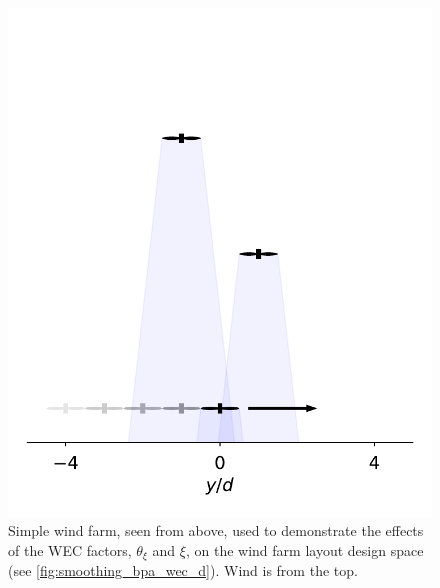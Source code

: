 \documentclass[a4paper]{jpconf}
\begin{document}
\begin{figure}[ht]
	\centering
	\begin{minipage}[t]{0.47\textwidth}
		\centering
		\includegraphics[width=\textwidth, trim={-2.0cm -0.0cm -2.0cm 3.5cm}, clip]{final_images/layouts/3turb-design-space}
		\caption{Simple wind farm, seen from above, used to demonstrate the effects of the WEC factors, $\theta_\xi$ and $\xi$, on the wind farm layout design space (see \cref{fig:smoothing_bpa_wec_d}). Wind is from the top.}
		\label{fig:smoothing_locations_bpa}
	\end{minipage}\hspace{1pc}

\end{figure}
\end{document}
